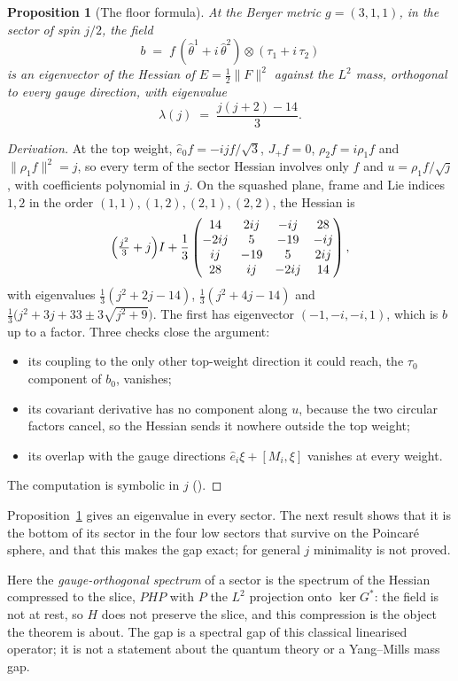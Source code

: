 \documentclass[11pt]{article}
\newtheorem{proposition}[theorem]{Proposition}
\theoremstyle{definition}
\theoremstyle{remark}
\newcommand{\norm}[1]{\lVert #1\rVert}
\begin{document}
\begin{proposition}[The floor formula]\label{prop:sector}
At the Berger metric $g=(3,1,1)$, in the sector of spin $j/2$, the field
\[
  b \;=\; f\,(\hat\theta^1+i\,\hat\theta^2)\otimes(\tau_1+i\,\tau_2)
\]
is an eigenvector of the Hessian of $E=\tfrac12\norm{F}^2$ against the $L^2$ mass, orthogonal to
every gauge direction, with eigenvalue
\[
  \lambda(j) \;=\; \frac{j(j+2)-14}{3}.
\]
\end{proposition}
\begin{proof}[Derivation]
At the top weight, $\hat e_0f=-ijf/\sqrt3$, $J_+f=0$, $\rho_2f=i\rho_1f$ and $\norm{\rho_1f}^2=j$, so
every term of the sector Hessian involves only $f$ and $u=\rho_1f/\sqrt j$, with coefficients
polynomial in $j$. On the squashed plane, frame and Lie indices $1,2$ in the order $(1,1),(1,2),
(2,1),(2,2)$, the Hessian is
\[
  \Bigl(\tfrac{j^2}{3}+j\Bigr)I+\frac13\begin{pmatrix}14&2ij&-ij&28\\-2ij&5&-19&-ij\\ ij&-19&5&2ij\\
  28&ij&-2ij&14\end{pmatrix},
\]
with eigenvalues $\tfrac13(j^2+2j-14)$, $\tfrac13(j^2+4j-14)$ and
$\tfrac13\bigl(j^2+3j+33\pm3\sqrt{j^2+9}\bigr)$. The first has eigenvector $(-1,-i,-i,1)$, which is
$b$ up to a factor. Three checks close the argument:
\begin{itemize}
  \item its coupling to the only other top-weight direction it could reach, the $\tau_0$ component
    of $b_0$, vanishes;
  \item its covariant derivative has no component along $u$, because the two circular factors cancel,
    so the Hessian sends it nowhere outside the top weight;
  \item its overlap with the gauge directions $\hat e_i\xi+[M_i,\xi]$ vanishes at every weight.
\end{itemize}
The computation is symbolic in $j$ ().
\end{proof}

Proposition~\ref{prop:sector} gives an eigenvalue in every sector. The next result shows that it is
the bottom of its sector in the four low sectors that survive on the Poincar\'e sphere, and that this
makes the gap exact; for general $j$ minimality is not proved.

Here the \emph{gauge-orthogonal spectrum} of a sector is the spectrum of the Hessian compressed to
the slice, $PHP$ with $P$ the $L^2$ projection onto $\ker G^*$: the field is not at rest, so $H$ does
not preserve the slice, and this compression is the object the theorem is about. The gap is a
spectral gap of this classical linearised operator; it is not a statement about the quantum theory
or a Yang--Mills mass gap.
\end{document}
